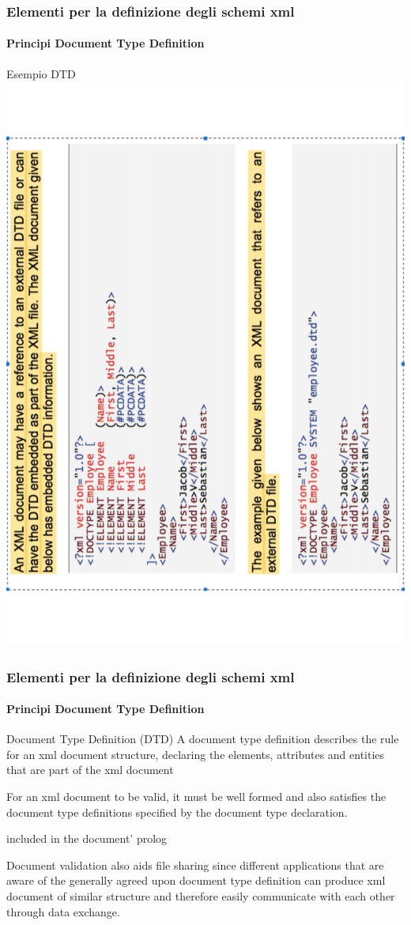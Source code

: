 
\begin{frame}
    \frametitle{Elementi per la definizione degli schemi xml}
    \framesubtitle{Principi Document Type Definition}
    \addtocounter{nframe}{1}

    \begin{block}{Esempio DTD}
        \includegraphics[width=.5\textwidth]{imgs/dtd_1.pdf}
    \end{block}

\end{frame}


\begin{frame}
    \frametitle{Elementi per la definizione degli schemi xml}
    \framesubtitle{Principi Document Type Definition}
    \addtocounter{nframe}{1}

    \begin{block}{Document Type Definition (DTD)}
        A document type definition describes the rule for an xml document structure,
declaring the elements, attributes and entities that are part of the xml
document
    \end{block}

\end{frame}

For an xml document to be valid, it must be well formed and also satisfies the
document type definitions specified by the document type declaration.

included in the document’ prolog

Document validation also aids file sharing since different applications that are
aware of the generally agreed upon document type definition can produce xml
document of similar structure and therefore easily communicate with each
other through data exchange.

